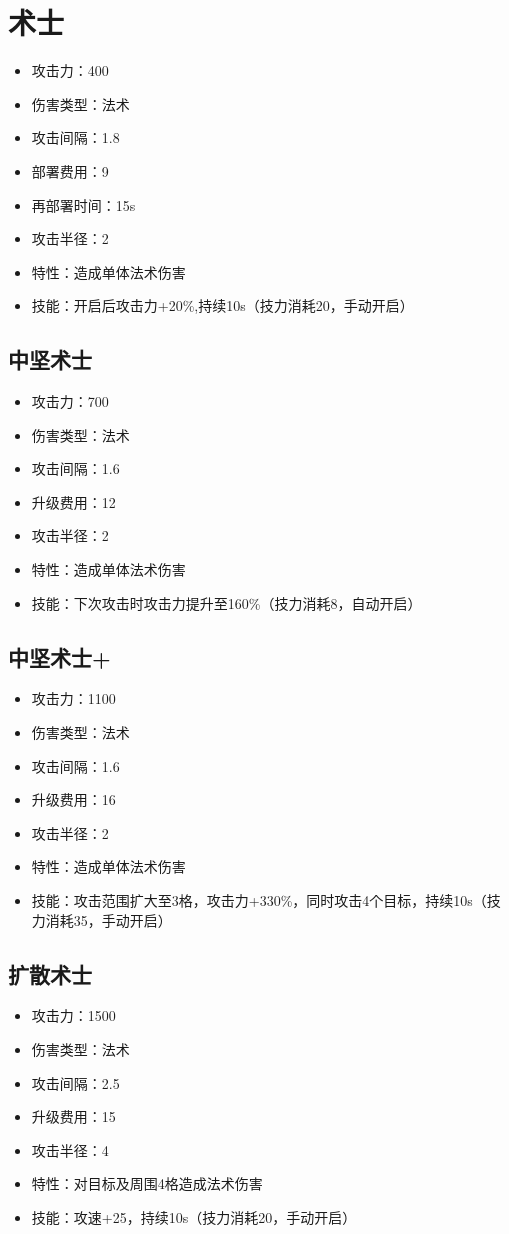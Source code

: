 \documentclass[a4paper,12pt]{article}
\begin{document}
	\section{术士}
		\begin{itemize}
			\item 攻击力：400
			\item 伤害类型：法术
			\item 攻击间隔：1.8
			\item 部署费用：9
			\item 再部署时间：15s
			\item 攻击半径：2
			\item 特性：造成单体法术伤害
			\item 技能：开启后攻击力+20\%,持续10s（技力消耗20，手动开启）
		\end{itemize}
		\subsection{中坚术士}
			\begin{itemize}
				\item 攻击力：700
				\item 伤害类型：法术
				\item 攻击间隔：1.6
				\item 升级费用：12
				\item 攻击半径：2
				\item 特性：造成单体法术伤害
				\item 技能：下次攻击时攻击力提升至160\%（技力消耗8，自动开启）
			\end{itemize}
		\subsection{中坚术士+}
			\begin{itemize}
				\item 攻击力：1100
				\item 伤害类型：法术
				\item 攻击间隔：1.6
				\item 升级费用：16
				\item 攻击半径：2
				\item 特性：造成单体法术伤害
				\item 技能：攻击范围扩大至3格，攻击力+330\%，同时攻击4个目标，持续10s（技力消耗35，手动开启）
			\end{itemize}
		\subsection{扩散术士}
			\begin{itemize}
				\item 攻击力：1500
				\item 伤害类型：法术
				\item 攻击间隔：2.5
				\item 升级费用：15
				\item 攻击半径：4
				\item 特性：对目标及周围4格造成法术伤害
				\item 技能：攻速+25，持续10s（技力消耗20，手动开启）
			\end{itemize}
\end{document}
